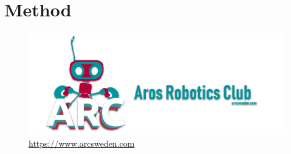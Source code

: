 \section{Method}
\redBlindText %
\begin{figure}[H]
    \centering
    \includegraphics[width=\columnwidth]{image/ARC}
    \caption{\url{https://www.arcsweden.com}}
    \label{fig:ARCbanner}
\end{figure}